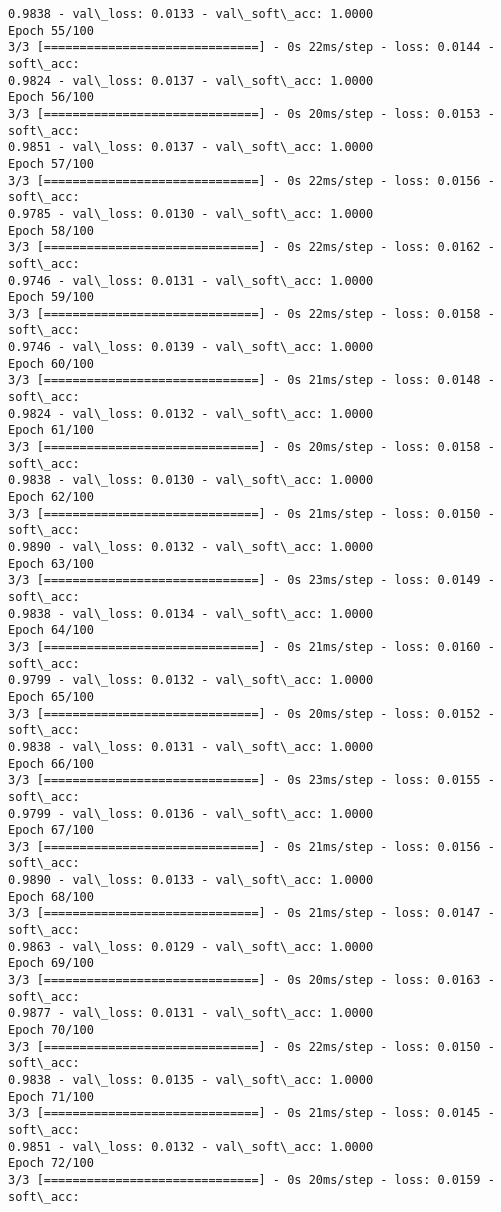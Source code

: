 \documentclass[11pt]{article}
\begin{document}
\begin{Verbatim}[commandchars=\\\{\}]
0.9838 - val\_loss: 0.0133 - val\_soft\_acc: 1.0000
Epoch 55/100
3/3 [==============================] - 0s 22ms/step - loss: 0.0144 - soft\_acc:
0.9824 - val\_loss: 0.0137 - val\_soft\_acc: 1.0000
Epoch 56/100
3/3 [==============================] - 0s 20ms/step - loss: 0.0153 - soft\_acc:
0.9851 - val\_loss: 0.0137 - val\_soft\_acc: 1.0000
Epoch 57/100
3/3 [==============================] - 0s 22ms/step - loss: 0.0156 - soft\_acc:
0.9785 - val\_loss: 0.0130 - val\_soft\_acc: 1.0000
Epoch 58/100
3/3 [==============================] - 0s 22ms/step - loss: 0.0162 - soft\_acc:
0.9746 - val\_loss: 0.0131 - val\_soft\_acc: 1.0000
Epoch 59/100
3/3 [==============================] - 0s 22ms/step - loss: 0.0158 - soft\_acc:
0.9746 - val\_loss: 0.0139 - val\_soft\_acc: 1.0000
Epoch 60/100
3/3 [==============================] - 0s 21ms/step - loss: 0.0148 - soft\_acc:
0.9824 - val\_loss: 0.0132 - val\_soft\_acc: 1.0000
Epoch 61/100
3/3 [==============================] - 0s 20ms/step - loss: 0.0158 - soft\_acc:
0.9838 - val\_loss: 0.0130 - val\_soft\_acc: 1.0000
Epoch 62/100
3/3 [==============================] - 0s 21ms/step - loss: 0.0150 - soft\_acc:
0.9890 - val\_loss: 0.0132 - val\_soft\_acc: 1.0000
Epoch 63/100
3/3 [==============================] - 0s 23ms/step - loss: 0.0149 - soft\_acc:
0.9838 - val\_loss: 0.0134 - val\_soft\_acc: 1.0000
Epoch 64/100
3/3 [==============================] - 0s 21ms/step - loss: 0.0160 - soft\_acc:
0.9799 - val\_loss: 0.0132 - val\_soft\_acc: 1.0000
Epoch 65/100
3/3 [==============================] - 0s 20ms/step - loss: 0.0152 - soft\_acc:
0.9838 - val\_loss: 0.0131 - val\_soft\_acc: 1.0000
Epoch 66/100
3/3 [==============================] - 0s 23ms/step - loss: 0.0155 - soft\_acc:
0.9799 - val\_loss: 0.0136 - val\_soft\_acc: 1.0000
Epoch 67/100
3/3 [==============================] - 0s 21ms/step - loss: 0.0156 - soft\_acc:
0.9890 - val\_loss: 0.0133 - val\_soft\_acc: 1.0000
Epoch 68/100
3/3 [==============================] - 0s 21ms/step - loss: 0.0147 - soft\_acc:
0.9863 - val\_loss: 0.0129 - val\_soft\_acc: 1.0000
Epoch 69/100
3/3 [==============================] - 0s 20ms/step - loss: 0.0163 - soft\_acc:
0.9877 - val\_loss: 0.0131 - val\_soft\_acc: 1.0000
Epoch 70/100
3/3 [==============================] - 0s 22ms/step - loss: 0.0150 - soft\_acc:
0.9838 - val\_loss: 0.0135 - val\_soft\_acc: 1.0000
Epoch 71/100
3/3 [==============================] - 0s 21ms/step - loss: 0.0145 - soft\_acc:
0.9851 - val\_loss: 0.0132 - val\_soft\_acc: 1.0000
Epoch 72/100
3/3 [==============================] - 0s 20ms/step - loss: 0.0159 - soft\_acc:

\end{Verbatim}
\end{document}
